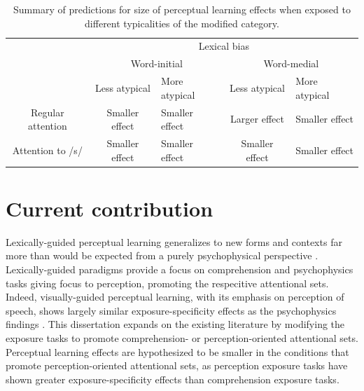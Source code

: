 \begin{table}[ht]
\caption{Summary of predictions for size of perceptual learning effects when exposed to different typicalities of the modified category.}
\label{tbl:predictionsAtyp}
\centering
\small
\begin{tabular}{cclcl}
\toprule
                     & \multicolumn{4}{c}{Lexical bias}                                                                        \\ 
\cline{2-5} 
                     & \multicolumn{2}{c}{Word-initial}                   & \multicolumn{2}{c}{Word-medial}                    \\
\cline{2-3} \cline{4-5}
 & Less atypical & More atypical  & Less atypical & More atypical  \\
\midrule
Regular attention    & Smaller effect                    & Smaller effect & Larger effect                     & Smaller effect \\
Attention to /s/     & Smaller effect                    & Smaller effect & Smaller effect                    & Smaller effect \\ \bottomrule
\end{tabular}
\end{table}

\section{Current contribution}

Lexically-guided perceptual learning generalizes to new forms and contexts far more than would be expected from a purely psychophysical perspective \citep{Norris2003,Gilbert2001}.
Lexically-guided paradigms provide a focus on comprehension and psychophysics tasks giving focus to perception, promoting the respecitive attentional sets.
Indeed, visually-guided perceptual learning, with its emphasis on perception of speech, shows largely similar exposure-specificity effects as the psychophysics findings \citep{Reinisch2014}.
This dissertation expands on the existing literature by modifying the exposure tasks to promote comprehension- or perception-oriented attentional sets.
Perceptual learning effects are hypothesized to be smaller in the conditions that promote perception-oriented attentional sets, as perception exposure tasks have shown greater exposure-specificity effects than comprehension exposure tasks.

